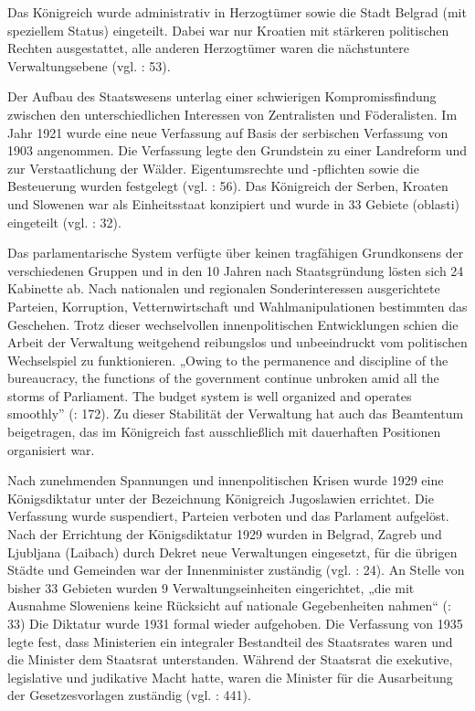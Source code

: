 Das Königreich wurde administrativ in Herzogtümer sowie die Stadt Belgrad (mit speziellem Status) eingeteilt. Dabei war nur Kroatien mit stärkeren politischen Rechten ausgestattet, alle anderen Herzogtümer waren die nächstuntere Verwaltungsebene (vgl. \cite{sevic}: 53).\par
Der Aufbau des Staatswesens unterlag einer schwierigen Kompromissfindung zwischen den unterschiedlichen Interessen von Zentralisten und Föderalisten. Im Jahr 1921 wurde eine neue Verfassung auf Basis der serbischen Verfassung von 1903 angenommen. Die Verfassung legte den Grundstein zu einer Landreform und zur Verstaatlichung der Wälder. Eigentumsrechte und -pflichten sowie die Besteuerung wurden festgelegt (vgl. \cite{beardradin}: 56). Das Königreich der Serben, Kroaten und Slowenen war als Einheitsstaat konzipiert und wurde in 33 Gebiete (oblasti) eingeteilt (vgl. \cite{beckm90}: 32).\par
Das parlamentarische System verfügte über keinen tragfähigen Grundkonsens der verschiedenen Gruppen und in den 10 Jahren nach Staatsgründung lösten sich 24 Kabinette ab. Nach nationalen und regionalen Sonderinteressen ausgerichtete Parteien, Korruption, Vetternwirtschaft und Wahlmanipulationen bestimmten das Geschehen. Trotz dieser wechselvollen innenpolitischen Entwicklungen schien die Arbeit der Verwaltung weitgehend reibungslos und unbeeindruckt vom politischen Wechselspiel zu funktionieren. „Owing to the permanence and discipline of the bureaucracy, the functions of the government continue unbroken amid all the storms of Parliament. The budget system is well organized and operates smoothly” (\cite{beardradin}: 172). Zu dieser Stabilität der Verwaltung hat auch das Beamtentum beigetragen, das im Königreich fast ausschließlich mit dauerhaften Positionen organisiert war.\par
Nach zunehmenden Spannungen und innenpolitischen Krisen wurde 1929 eine Königsdiktatur unter der Bezeichnung Königreich Jugoslawien errichtet. Die Verfassung wurde suspendiert, Parteien verboten und das Parlament aufgelöst. Nach der Errichtung der Königsdiktatur 1929 wurden in Belgrad, Zagreb und Ljubljana (Laibach) durch Dekret neue Verwaltungen eingesetzt, für die übrigen Städte und Gemeinden war der Innenminister zuständig (vgl. \cite{libal}: 24). An Stelle von bisher 33 Gebieten wurden 9 Verwaltungseinheiten eingerichtet, „die mit Ausnahme Sloweniens keine Rücksicht auf nationale Gegebenheiten nahmen“ (\cite{beckm90}: 33) Die Diktatur wurde 1931 formal wieder aufgehoben. Die Verfassung von 1935 legte fest, dass Ministerien ein integraler Bestandteil des Staatsrates waren und die Minister dem Staatsrat unterstanden. Während der Staatsrat die exekutive, legislative und judikative Macht hatte, waren die Minister für die Ausarbeitung der Gesetzesvorlagen zuständig (vgl. \cite{kinhil}: 441).


